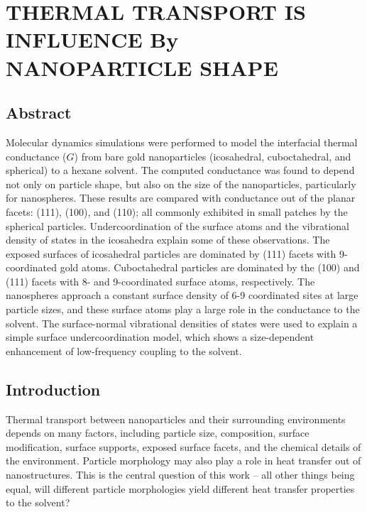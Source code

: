 \section{THERMAL TRANSPORT IS INFLUENCE By NANOPARTICLE SHAPE}
\subsection{Abstract}
  Molecular dynamics simulations were performed to model the
  interfacial thermal conductance ($G$) from bare gold nanoparticles
  (icosahedral, cuboctahedral, and spherical) to a hexane
  solvent. The computed conductance was found to depend not only on
  particle shape, but also on the size of the nanoparticles,
  particularly for nanospheres.  These results are compared with
  conductance out of the planar facets: (111), (100), and (110);
  all commonly exhibited in small patches by the spherical
  particles. Undercoordination of the surface atoms and the
  vibrational density of states in the icosahedra explain some of
  these observations. The exposed surfaces of icosahedral particles
  are dominated by (111) facets with 9-coordinated gold atoms.
  Cuboctahedral particles are dominated by the (100) and (111) facets
  with 8- and 9-coordinated surface atoms, respectively.  The
  nanospheres approach a constant surface density of 6-9 coordinated
  sites at large particle sizes, and these surface atoms play a large
  role in the conductance to the solvent.  The surface-normal
  vibrational densities of states were used to explain a simple
  surface undercoordination model, which shows a size-dependent
  enhancement of low-frequency coupling to the solvent.


\subsection{Introduction}
Thermal transport between nanoparticles and their surrounding
environments depends on many factors, including particle
size,\cite{Zanjani2014,Liu2015,Wilhelmsen2015,Stocker2016,Tascini2016}
composition,\cite{Wilson:2002uq, Ge:2004,Ong:2013rt} surface
modification,\cite{Ge:2004,kuang:AuThl,Ong:2013rt,Ong:2014yq,Liu2015,Stocker2016,Hannah2015,Park2016,Meng:2017,Leitner2017}
surface supports,\cite{Schmidt:2010,Park2012} exposed surface
facets,\cite{Norris:2013,Hannah2015,Han:2017} and the chemical details
of the
environment.\cite{Ge2006,Schmidt:2010,Park2012,Ong:2013rt,Ong:2014yq,Wilhelmsen2015,Giri:2016,Park2016,Bhanushali:2017,Yadav:2017}
Particle morphology may also play a role in heat transfer out of
nanostructures.  This is the central question of this work -- all
other things being equal, will different particle morphologies yield
different heat transfer properties to the solvent?

